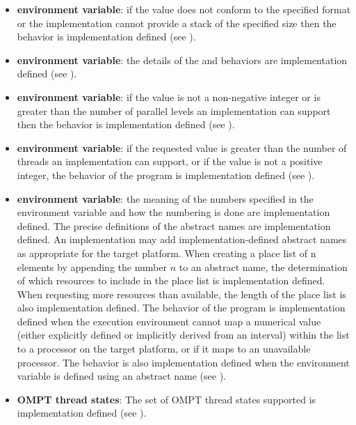 \begin{itemize}
\item {} \textbf{environment variable}: if the value does not conform to the 
specified format or the implementation cannot provide a stack of the specified size 
then the behavior is implementation defined (see ).

\item {} \textbf{environment variable}: the details of the  and 
 behaviors are implementation defined (see ).

\item {} \textbf{environment variable}: if the value is not a 
non-negative integer or is greater than the number of parallel levels an implementation 
can support then the behavior is implementation defined (see ).

\item {} \textbf{environment variable}: if the requested value is greater than 
the number of threads an implementation can support, or if the value is not a positive 
integer, the behavior of the program is implementation defined (see ).

\item {} \textbf{environment variable}: the meaning of the numbers specified in the 
environment variable and how the numbering is done are implementation defined. 
The precise definitions of the abstract names are implementation defined. An
implementation may add implementation-defined abstract names as appropriate for 
the target platform. When creating a place list of n elements by appending the 
number $n$ to an abstract name, the determination of which resources to include in the 
place list is implementation defined. When requesting more resources than available, 
the length of the place list is also implementation defined. The behavior of the 
program is implementation defined when the execution environment cannot map a 
numerical value (either explicitly defined or implicitly derived from an interval) 
within the  list to a processor on the target platform, or if it maps to an 
unavailable processor. The behavior is also implementation defined when the 
 environment variable is defined using an abstract name (see ).

\item \textbf{OMPT thread states}: The set of OMPT thread states supported is implementation defined (see ).


\end{itemize}
